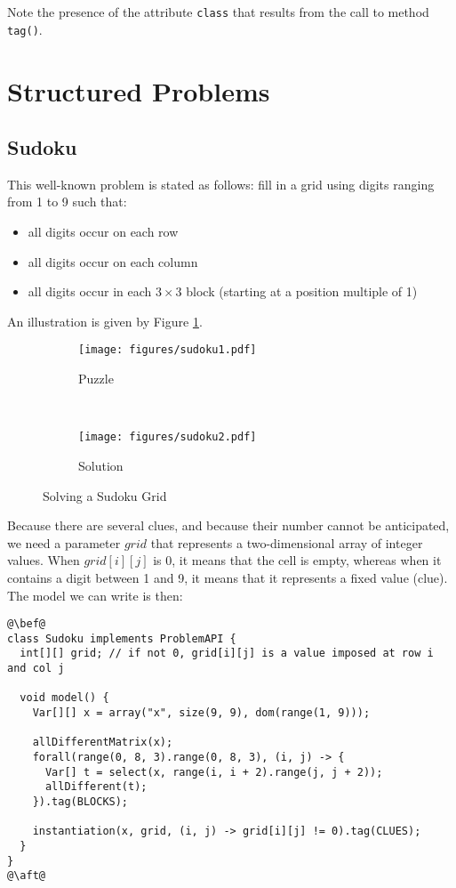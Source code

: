 \documentclass[10pt]{article}
\newcommand{\nn}[1]{{\tt #1}} %
\begin{document}
Note the presence of the attribute \nn{class} that results from the call to method \nn{tag()}.


\section{Structured Problems}

\subsection{Sudoku}

This well-known problem is stated as follows: fill in a grid using digits ranging from 1 to 9 such that:
\begin{itemize}
\item all digits occur on each row
\item all digits occur on each column
  \item all digits occur in each $3 \times 3$ block (starting at a position multiple of 1) 
\end{itemize}
An illustration is given by Figure \ref{fig:sudoku}.

\begin{figure}[h]
  \centering
    \begin{subfigure}[t]{0.5\textwidth}
        \centering
        \texttt{[image: figures/sudoku1.pdf]}
        \caption{Puzzle}
    \end{subfigure}%
    ~ 
    \begin{subfigure}[t]{0.5\textwidth}
        \centering
        \texttt{[image: figures/sudoku2.pdf]}
        \caption{Solution}
    \end{subfigure}
    \caption{Solving a Sudoku Grid\label{fig:sudoku}}
\end{figure}

Because there are several clues, and because their number cannot be anticipated, we need a parameter $grid$ that represents a two-dimensional array of integer values.
When $grid[i][j]$ is 0, it means that the cell is empty, whereas when it contains a digit between 1 and 9, it means that it represents a fixed value (clue).
The model we can write is then:


\begin{lstlisting}
@\bef@
class Sudoku implements ProblemAPI {
  int[][] grid; // if not 0, grid[i][j] is a value imposed at row i and col j

  void model() {
    Var[][] x = array("x", size(9, 9), dom(range(1, 9)));

    allDifferentMatrix(x);
    forall(range(0, 8, 3).range(0, 8, 3), (i, j) -> {
      Var[] t = select(x, range(i, i + 2).range(j, j + 2));
      allDifferent(t);
    }).tag(BLOCKS);
    
    instantiation(x, grid, (i, j) -> grid[i][j] != 0).tag(CLUES);
  }
}
@\aft@
\end{lstlisting}
\end{document}

